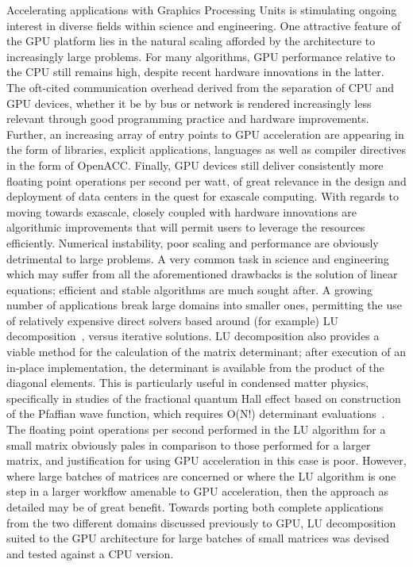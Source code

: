 \documentclass[letter, 12pt]{article}
\begin{document}
Accelerating applications with Graphics Processing Units is stimulating ongoing interest in diverse fields within science and engineering. One attractive feature of the GPU platform lies in the natural scaling afforded by the architecture to increasingly large problems. For many algorithms, GPU performance relative to the CPU still remains high, despite recent hardware innovations in the latter. The oft-cited communication overhead derived from the separation of CPU and GPU devices, whether it be by bus or network  is rendered increasingly less relevant through good programming practice and hardware improvements.  Further, an increasing array of entry points to GPU acceleration are appearing in the form of libraries, explicit applications, languages as well as compiler directives in the form of OpenACC. Finally, GPU devices still deliver consistently more floating point operations per second per watt, of great relevance in the design and deployment of data centers in the quest for exascale computing. With regards to moving towards exascale, closely coupled with hardware innovations are algorithmic improvements that will permit users to leverage the resources efficiently. Numerical instability, poor scaling and performance are obviously detrimental to large problems. A very common task in science and engineering which may suffer from all the aforementioned drawbacks is the solution of linear equations; efficient and stable algorithms are much sought after. A growing number of applications break large domains into smaller ones, permitting the use of relatively expensive direct solvers based around (for example) LU decomposition~\cite{cbfm}, versus iterative solutions. LU decomposition also provides a viable method for the calculation of the matrix determinant; after execution of an in-place implementation, the determinant is available from the product of the diagonal elements. This is particularly useful in condensed matter physics, specifically in studies of the fractional quantum Hall effect based on construction of the Pfaffian wave function, which requires O(N!) determinant evaluations~\cite{sree}. The floating point operations per second performed in the LU algorithm for a small matrix obviously pales in comparison to those performed for a larger matrix, and justification for using GPU acceleration in this case is poor. However, where large batches of matrices are concerned or where the LU algorithm is one step in a larger workflow amenable to GPU acceleration, then the approach as detailed may be of great benefit. Towards porting both complete applications from the two different domains discussed previously to GPU, LU decomposition suited to the GPU architecture for large batches of small matrices was devised and tested against a CPU version. 
\end{document}
